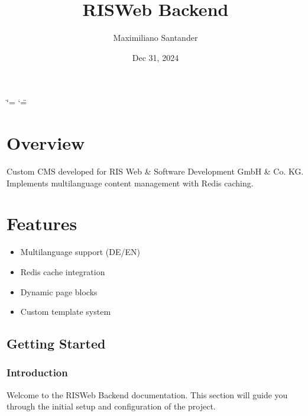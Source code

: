 \documentclass[letterpaper,10pt,english]{sphinxmanual}
\title{RIS\sphinxhyphen{}Web Backend}
\date{Dec 31, 2024}
\author{Maximiliano Santander}
\begin{document}
\ifdefined\shorthandoff
  \ifnum\catcode`\=\string=\active\shorthandoff{=}\fi
  \ifnum\catcode`\"=\active{}\fi
\fi

\pagestyle{empty}
\sphinxmaketitle
\pagestyle{plain}
\sphinxtableofcontents
\pagestyle{normal}
\label{\detokenize{index::doc}}



\chapter{Overview}
\label{\detokenize{index:overview}}
\sphinxAtStartPar
Custom CMS developed for RIS Web \& Software Development GmbH \& Co. KG.
Implements multi\sphinxhyphen{}language content management with Redis caching.


\chapter{Features}
\label{\detokenize{index:features}}\begin{itemize}
\item {} 
\sphinxAtStartPar
Multi\sphinxhyphen{}language support (DE/EN)

\item {} 
\sphinxAtStartPar
Redis cache integration

\item {} 
\sphinxAtStartPar
Dynamic page blocks

\item {} 
\sphinxAtStartPar
Custom template system

\end{itemize}

\sphinxstepscope


\section{Getting Started}
\label{\detokenize{getting_started/index:getting-started}}\label{\detokenize{getting_started/index::doc}}

\subsection{Introduction}
\label{\detokenize{getting_started/index:introduction}}
\sphinxAtStartPar
Welcome to the RIS\sphinxhyphen{}Web Backend documentation. This section will guide you through the initial setup and configuration of the project.
\end{document}
